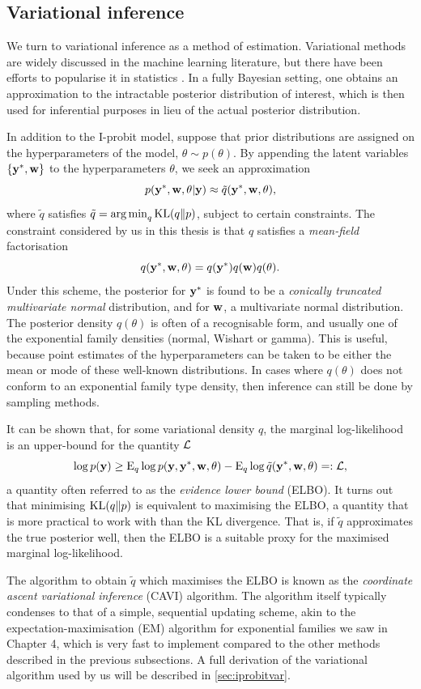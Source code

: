 \subsection{Variational inference}

We turn to variational inference as a method of estimation. 
Variational methods are widely discussed in the machine learning literature, but there have been efforts to popularise it in statistics \citep{blei2017variational}.
In a fully Bayesian setting, one obtains an approximation to the intractable posterior distribution of interest, which is then used for inferential purposes in lieu of the actual posterior distribution.

In addition to the I-probit model, suppose that prior distributions are assigned on the hyperparameters of the model, $\theta \sim p(\theta)$.
By appending the latent variables $\{{\mathbf y}^*,{\mathbf w}\}$ to the hyperparameters $\theta$, we seek an approximation
\[
  p({\mathbf y}^*,{\mathbf w},\theta | {\mathbf y}) \approx \tilde q({\mathbf y}^*,{\mathbf w},\theta),
\]
where $\tilde q$ satisfies $\tilde q = \operatorname*{arg\,min}_q \operatorname{KL}(q\Vert p)$, subject to certain constraints.
The constraint considered by us in this thesis is that $q$ satisfies a \emph{mean-field} factorisation
\[
  q({\mathbf y}^*,{\mathbf w},\theta) = q({\mathbf y}^*)q({\mathbf w})q(\theta).
\]
Under this scheme, the posterior for ${\mathbf y}^*$ is found to be a \emph{conically truncated multivariate normal} distribution, and for ${\mathbf w}$, a multivariate normal distribution.
The posterior density $q(\theta)$ is often of a recognisable form, and usually one of the exponential family densities (normal, Wishart or gamma).
This is useful, because point estimates of the hyperparameters can be taken to be either the mean or mode of these well-known distributions.
In cases where $q(\theta)$ does not conform to an exponential family type density, then inference can still be done by sampling methods.

It can be shown that, for some variational density $q$, the marginal log-likelihood is an upper-bound for the quantity ${\mathcal L}$
\[
  \log p({\mathbf y}) \geq 
    \operatorname{E}_{ q} \log p({\mathbf y},{\mathbf y}^*,{\mathbf w},\theta)
    - \operatorname{E}_{ q} \log \tilde q({\mathbf y}^*,{\mathbf w},\theta) =: {\mathcal L},
\]
a quantity often referred to as the \emph{evidence lower bound} (ELBO).
It turns out that minimising $\operatorname{KL}(q\Vert p)$ is equivalent to maximising the ELBO, a quantity that is more practical to work with than the KL divergence.
That is, if $\tilde q$ approximates the true posterior well, then the ELBO is a suitable proxy for the maximised marginal log-likelihood.

The algorithm to obtain $\tilde q$ which maximises the ELBO is known as the \emph{coordinate ascent variational inference} (CAVI) algorithm.
The algorithm itself typically condenses to that of a simple, sequential updating scheme, akin to the expectation-maximisation (EM) algorithm for exponential families we saw in Chapter 4, which is very fast to implement compared to the other methods described in the previous subsections.
A full derivation of the variational algorithm used by us will be described in \cref{sec:iprobitvar}.

